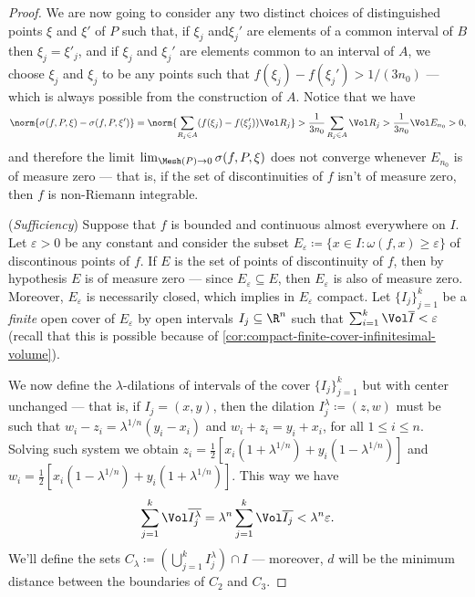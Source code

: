 \begin{proof}
We are now going to consider any two distinct choices of distinguished points
\(\xi\) and \(\xi'\) of \(P\) such that, if \(\xi_j\) and\(\xi_j'\) are elements
of a common interval of \(B\) then \(\xi_j = \xi'_j\), and if \(\xi_j\) and
\(\xi_j'\) are elements common to an interval of \(A\), we choose \(\xi_j\) and
\(\xi_j\) to be any points such that \(f(\xi_j) - f(\xi_j') > 1/(3n_0)\) ---
which is always possible from the construction of \(A\). Notice that we have
\[
  \norm{\sigma(f, P, \xi) - \sigma(f, P, \xi')}
  = \norm{\sum_{R_{j} \in A} (f(\xi_j) - f(\xi_j')) \Vol R_j}
  > \frac 1 {3 n_0} \sum_{R_j \in A} \Vol R_j
  > \frac 1 {3 n_0} \Vol E_{n_0} > 0,
\]
and therefore the limit \(\lim_{\Mesh(P) \to 0} \sigma(f, P, \xi)\) does not
converge whenever \(E_{n_0}\) is of measure zero --- that is, if the set of
discontinuities of \(f\) isn't of measure zero, then \(f\) is non-Riemann
integrable.

(\emph{Sufficiency}) Suppose that \(f\) is bounded and continuous almost
everywhere on \(I\). Let \(\varepsilon > 0\) be any constant and consider the
subset \(E_{\varepsilon} \coloneq \{x \in I \colon \omega(f, x) \geq \varepsilon\}\)
of discontinous points of \(f\). If \(E\) is the set of points of discontinuity
of \(f\), then by hypothesis \(E\) is of measure zero --- since
\(E_{\varepsilon} \subseteq E\), then \(E_{\varepsilon}\) is also of measure
zero. Moreover, \(E_{\varepsilon}\) is necessarily closed, which implies in
\(E_{\varepsilon}\) compact. Let \(\{I_{j}\}_{j=1}^k\) be a \emph{finite} open
cover of \(E_{\varepsilon}\) by open intervals \(I_j \subseteq \R^n\) such that
\(\sum_{i=1}^k \Vol \overline{I} < \varepsilon\) (recall that this is possible
because of \cref{cor:compact-finite-cover-infinitesimal-volume}).

We now define the \(\lambda\)-dilations of intervals of the cover
\(\{I_{j}\}_{j=1}^k\) but with center unchanged --- that is, if \(I_j = (x,
y)\), then the dilation \(I_{j}^{\lambda} \coloneq (z, w)\) must be such that
\(w_i - z_i = \lambda^{1/n} (y_i - x_i)\) and \(w_i + z_i = y_i + x_i\), for all
\(1 \leq i \leq n\). Solving such system we obtain \(z_i = \frac 1 2 [x_i(1 +
\lambda^{1/n}) + y_i(1 - \lambda^{1/n})]\) and \(w_i = \frac 1 2 [x_i(1 -
\lambda^{1/n}) + y_i(1 + \lambda^{1/n})]\). This way we have
\[
  \sum_{j=1}^k \Vol \overline{I_j^{\lambda}}
  = \lambda^n \sum_{j=1}^k \Vol \overline{I_j}
  < \lambda^n \varepsilon.
\]
We'll define the sets \(C_{\lambda} \coloneq (\bigcup_{j=1}^k I_j^{\lambda})
\cap I\) --- moreover, \(d\) will be the minimum distance between the boundaries
of \(C_2\) and \(C_3\).


\end{proof}

